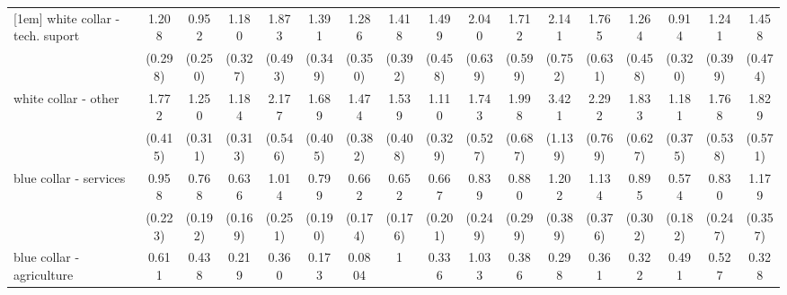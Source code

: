 {\begin{tabular}{l*{16}{c}}
[1em]
white collar - tech. suport&       1.208         &       0.952         &       1.180         &       1.873\sym{*}  &       1.391         &       1.286         &       1.418         &       1.499         &       2.040\sym{*}  &       1.712         &       2.141\sym{*}  &       1.765         &       1.264         &       0.914         &       1.241         &       1.458         \\
                    &     (0.298)         &     (0.250)         &     (0.327)         &     (0.493)         &     (0.349)         &     (0.350)         &     (0.392)         &     (0.458)         &     (0.639)         &     (0.599)         &     (0.752)         &     (0.631)         &     (0.458)         &     (0.320)         &     (0.399)         &     (0.474)         \\
[1em]
white collar - other&       1.772\sym{*}  &       1.250         &       1.184         &       2.177\sym{**} &       1.689\sym{*}  &       1.474         &       1.539         &       1.110         &       1.743         &       1.998\sym{*}  &       3.421\sym{***}&       2.292\sym{*}  &       1.833         &       1.181         &       1.768         &       1.829         \\
                    &     (0.415)         &     (0.311)         &     (0.313)         &     (0.546)         &     (0.405)         &     (0.382)         &     (0.408)         &     (0.329)         &     (0.527)         &     (0.687)         &     (1.139)         &     (0.769)         &     (0.627)         &     (0.375)         &     (0.538)         &     (0.571)         \\
[1em]
blue collar - services&       0.958         &       0.768         &       0.636         &       1.014         &       0.799         &       0.662         &       0.652         &       0.667         &       0.839         &       0.880         &       1.202         &       1.134         &       0.895         &       0.574         &       0.830         &       1.179         \\
                    &     (0.223)         &     (0.192)         &     (0.169)         &     (0.251)         &     (0.190)         &     (0.174)         &     (0.176)         &     (0.201)         &     (0.249)         &     (0.299)         &     (0.389)         &     (0.376)         &     (0.302)         &     (0.182)         &     (0.247)         &     (0.357)         \\
[1em]
blue collar - agriculture&       0.611         &       0.438         &       0.219\sym{*}  &       0.360         &       0.173\sym{*}  &      0.0804\sym{*}  &           1         &       0.336         &       1.033         &       0.386         &       0.298         &       0.361         &       0.322         &       0.491         &       0.527         &       0.328         \\

\end{tabular}}
